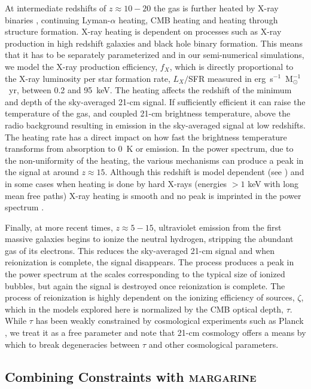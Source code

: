 At intermediate redshifts of $z\approx 10 -20$ the gas is further heated by X-ray binaries \cite{Fragos_Xrays_2013, fialkov_observable_2014}, continuing Lyman-$\alpha$ heating, CMB heating \cite{Venumadhav2018} and heating through structure formation. X-ray heating is dependent on processes such as X-ray production in high redshift galaxies and black hole binary formation. This means that it has to be separately parameterized and in our semi-numerical simulations, we model the X-ray production efficiency, $f_X$, which is directly proportional to the X-ray luminosity per star formation rate, $L_X/$SFR measured in erg~s$^{-1}$~M$_\odot^{-1}$~yr, between 0.2 and 95~keV. The heating affects the redshift of the minimum and depth of the sky-averaged 21-cm signal. If sufficiently efficient it can raise the temperature of the gas, and coupled 21-cm brightness temperature, above the radio background resulting in emission in the sky-averaged signal at low redshifts. The heating rate has a direct impact on how fast the brightness temperature transforms from absorption to 0~K or emission. In the power spectrum, due to the non-uniformity of the heating, the various mechanisms can produce a peak in the signal at around $z\approx 15$. Although this redshift is model dependent (see \cite{Cohen_power_2018}) and in some cases when heating is done by hard X-rays (energies $>1$ keV with long mean free paths) X-ray heating is smooth and no peak is imprinted in the power spectrum \cite{fialkov_observable_2014, Fialkov_rich_2014}.

Finally, at more recent times, $z \approx 5 - 15$, ultraviolet emission from the first massive galaxies begins to ionize the neutral hydrogen, stripping the abundant gas of its electrons. This reduces the sky-averaged 21-cm signal and when reionization is complete, the signal disappears. The process produces a peak in the power spectrum at the scales corresponding to the typical size of ionized bubbles, but again the signal is destroyed once reionization is complete. The process of reionization is highly dependent on the ionizing efficiency of sources, $\zeta$, which in the models explored here is normalized by the CMB optical depth, $\tau$. While $\tau$ has been weakly constrained by cosmological experiments such as Planck \cite{Planck2018}, we treat it as a free parameter and note that 21-cm cosmology offers a means by which to break degeneracies between $\tau$ and other cosmological parameters.

\subsection{Combining Constraints with \textsc{margarine}}

